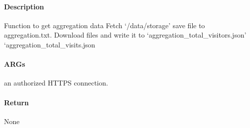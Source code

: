 \documentclass[letterpaper,10pt,english]{sphinxmanual}
\begin{document}
\begin{fulllineitems}
\label{\detokenize{gemini_data_recording:gemini_data_recording.aggregation_data}}
\pysigstartsignatures
{}
\pysigstopsignatures

\paragraph{Description}
\label{\detokenize{gemini_data_recording:id1}}
\sphinxAtStartPar
Function to get aggregation data
Fetch ‘/data/storage’
save file to aggregation.txt.
Download files and write it to
‘aggregation\_total\_visitors.json’
‘aggregation\_total\_visits.json


\paragraph{ARGs}
\label{\detokenize{gemini_data_recording:args}}\begin{description}
\sphinxAtStartPar
an authorized HTTPS connection.

\end{description}


\paragraph{Return}
\label{\detokenize{gemini_data_recording:return}}
\sphinxAtStartPar
None

\end{fulllineitems}

\end{document}
